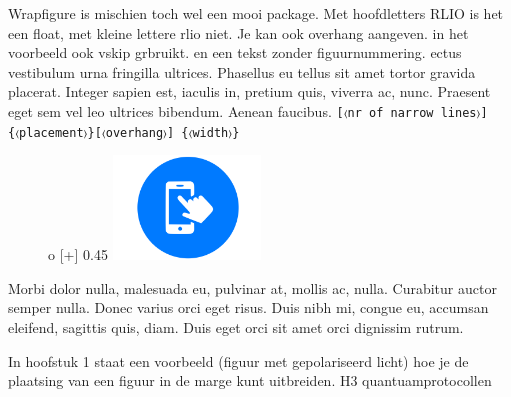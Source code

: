 \documentclass[../../main.tex]{subfiles}
\begin{document}
Wrapfigure is mischien toch wel een mooi package. Met hoofdletters {RLIO} is het een float, met kleine lettere {rlio} niet. Je kan ook overhang aangeven. in het voorbeeld ook vskip grbruikt. en een tekst zonder figuurnummering.
ectus vestibulum urna fringilla ultrices.  Phasellus eu tellus sit amet 
tortor gravida placerat. Integer sapien est, iaculis in, pretium quis, 
viverra ac, nunc. Praesent eget sem vel leo ultrices bibendum. Aenean 
faucibus.
\verb+[〈nr of narrow lines〉]{〈placement〉}[〈overhang〉] {〈width〉}+
\begin{figure}%
{o}%
[\marginparwidth+\marginparsep]%
{0.45\textwidth}%
\centering
\vskip0cm
\includegraphics[width=0.35\textwidth]{./img/smartphone verplicht.png}

\end{figure}
Morbi dolor nulla, malesuada eu, pulvinar at, mollis ac, nulla. Curabitur 
auctor semper nulla. Donec varius orci eget risus. Duis nibh mi, congue eu, 
accumsan eleifend, sagittis quis, diam. Duis eget orci sit amet orci 
dignissim rutrum.



In hoofstuk 1 staat een voorbeeld (figuur met gepolariseerd licht) hoe je de plaatsing van een figuur in de marge kunt uitbreiden.
H3 quantuamprotocollen
\end{document}
